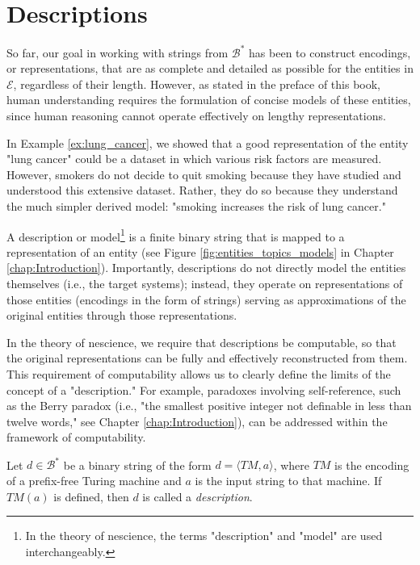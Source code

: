 %
%

\section{Descriptions}
\label{sec:descriptions_models}

So far, our goal in working with strings from $\mathcal{B}^\ast$ has been to construct encodings, or representations, that are as complete and detailed as possible for the entities in $\mathcal{E}$, regardless of their length. However, as stated in the preface of this book, human understanding requires the formulation of concise models of these entities, since human reasoning cannot operate effectively on lengthy representations.

\begin{example}
In Example \ref{ex:lung_cancer}, we showed that a good representation of the entity "lung cancer" could be a dataset in which various risk factors are measured. However, smokers do not decide to quit smoking because they have studied and understood this extensive dataset. Rather, they do so because they understand the much simpler derived model: "smoking increases the risk of lung cancer."
\end{example}

A description or model\footnote{In the theory of nescience, the terms "description" and "model" are used interchangeably.} is a finite binary string that is mapped to a representation of an entity (see Figure \ref{fig:entities_topics_models} in Chapter \ref{chap:Introduction}). Importantly, descriptions do not directly model the entities themselves (i.e., the target systems); instead, they operate on representations of those entities (encodings in the form of strings) serving as approximations of the original entities through those representations.

In the theory of nescience, we require that descriptions be computable, so that the original representations can be fully and effectively reconstructed from them. This requirement of computability allows us to clearly define the limits of the concept of a "description." For example, paradoxes involving self-reference, such as the Berry paradox (i.e., "the smallest positive integer not definable in less than twelve words," see Chapter \ref{chap:Introduction}), can be addressed within the framework of computability.

\begin{definition} [Model]
\label{def:description_model}
Let $d \in \mathcal{B}^\ast$ be a binary string of the form $d = \langle TM, a \rangle$, where $TM$ is the encoding of a prefix-free Turing machine and $a$ is the input string to that machine. If $TM(a)$ is defined, then $d$ is called a \emph{description}.
\end{definition}

